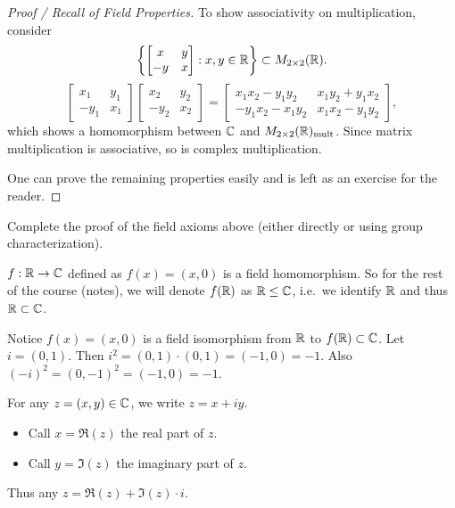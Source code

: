 \documentclass[11pt]{article}
\begin{document}
\begin{proof}[Proof / Recall of Field Properties]
To show associativity on multiplication, consider
\[
\left\{ \begin{bmatrix} x & y \\ -y & x \end{bmatrix} : x,y \in {\mathbb{R}} \right\} \subset M_{2\times 2}({\mathbb{R}}).
\]
\[
\begin{bmatrix} x_1 & y_1 \\ -y_1 & x_1 \end{bmatrix}\begin{bmatrix} x_2 & y_2 \\ -y_2 & x_2 \end{bmatrix} = \begin{bmatrix} x_1x_2 - y_1y_2 & x_1y_2 + y_1x_2 \\ -y_1x_2-x_1y_2 & x_1x_2 - y_1y_2\end{bmatrix},
\]
which shows a homomorphism between ${\mathbb{C}}$ and $M_{2\times 2}({\mathbb{R}})_{\text{mult}}$. Since matrix multiplication is associative, so is complex multiplication.

One can prove the remaining properties easily and is left as an exercise for the reader.
\end{proof}

\begin{exercise}
    Complete the proof of the field axioms above (either directly or using group characterization).
\end{exercise}

\begin{remark}
$f: {\mathbb{R}} \to {\mathbb{C}}$ defined as $f(x) = (x,0)$ is a field homomorphism. So for the rest of the course (notes), we will denote $f({\mathbb{R}})$ as ${\mathbb{R}} \le {\mathbb{C}}$, i.e.\ we identify ${\mathbb{R}}$ and thus ${\mathbb{R}} \subset {\mathbb{C}}$.
\end{remark}

\begin{remark}
Notice $f(x) = (x,0)$ is a field isomorphism from ${\mathbb{R}}$ to $f({\mathbb{R}}) \subset {\mathbb{C}}$.
Let $i = (0,1)$. Then $i^2 = (0,1)\cdot (0,1) = (-1,0) = -1$.
Also $(-i)^2 = (0,-1)^2 = (-1,0) = -1$.

For any $z = (x,y) \in {\mathbb{C}}$, we write $z = x + iy$.
\begin{itemize}
    \item Call $x = \Re(z)$ the real part of $z$.
    \item Call $y = \Im(z)$ the imaginary part of $z$.
\end{itemize}
Thus any $z = \Re(z) + \Im(z) \cdot i$.
\end{remark}
\end{document}
